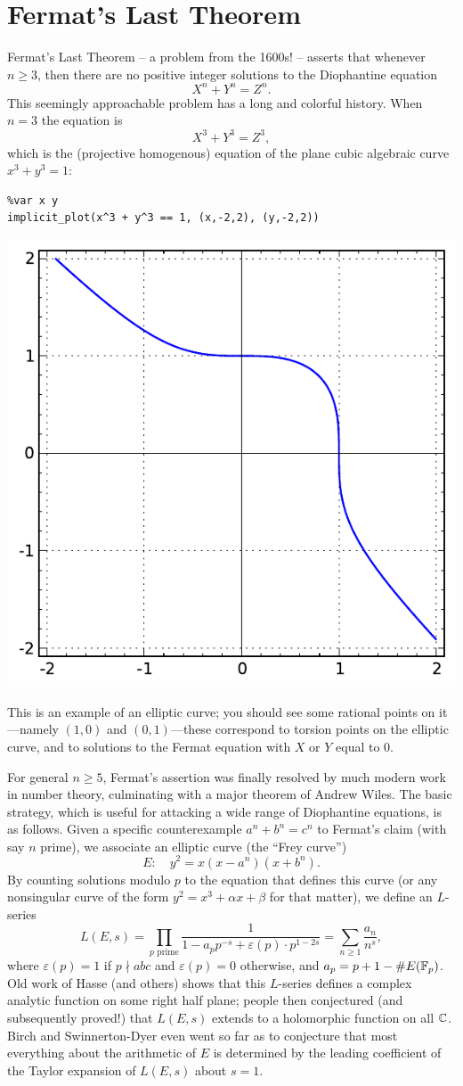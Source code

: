 \documentclass{book}
\begin{document}
\section{Fermat's Last Theorem}\label{sec:fltintro}
Fermat's Last Theorem -- a problem from the 1600s! -- asserts
that whenever $n\geq 3$, then there are no positive integer
solutions to the Diophantine equation
$$
X^n + Y^n = Z^n.
$$
This seemingly approachable problem has a long and colorful
history.
When $n=3$ the equation is
$$
X^3 + Y^3 = Z^3,
$$
which is the (projective homogenous) equation of the plane cubic algebraic
curve $x^3 + y^3 = 1$:
\begin{lstlisting}
%var x y
implicit_plot(x^3 + y^3 == 1, (x,-2,2), (y,-2,2))
\end{lstlisting}
\begin{center}
\includegraphics[width=.5\textwidth]{pics/flt3.pdf}
\end{center}
This is an example of an elliptic curve; you should
see some rational points on it---namely $(1,0)$ and $(0,1)$---these
correspond to torsion points on the elliptic curve, and to solutions
to the Fermat equation with $X$ or $Y$ equal to $0$.

For general $n\geq 5$, Fermat's assertion was finally resolved by much modern
work in number theory, culminating with a major theorem of
Andrew Wiles.  The basic strategy, which is useful for
attacking a wide range of Diophantine equations, is as follows.
Given a specific counterexample
$a^n + b^n = c^n$ to Fermat's claim (with say $n$ prime), we associate
an elliptic curve (the ``Frey curve'')
$$
  E: \quad y^2 = x(x-a^n)(x+b^n).
$$
By counting solutions modulo $p$ to the equation that defines this curve (or
any nonsingular curve of the form $y^2=x^3+\alpha x + \beta$ for that matter),
we define an $L$-series
$$
L(E,s) =
\prod_{p \text{ prime}} \frac{1}{1-a_p p^{-s} + \varepsilon(p)\cdot p^{1-2s}}
 = \sum_{n\geq 1} \frac{a_n}{n^s},
$$
where $\varepsilon(p)=1$ if $p\nmid abc$ and $\varepsilon(p)=0$ otherwise,
and $a_p = p+1-\#E(\mathbb{F}_p)$.
Old work of Hasse (and others)
shows that this $L$-series defines a complex analytic
function on some right half plane; people then conjectured (and
subsequently proved!)
that $L(E,s)$ extends to a holomorphic function on all $\mathbb{C}$.
Birch and Swinnerton-Dyer even went so far as to conjecture
that most everything about the arithmetic of $E$
is determined by the leading coefficient of the
Taylor expansion of $L(E,s)$ about $s=1$.
\end{document}
